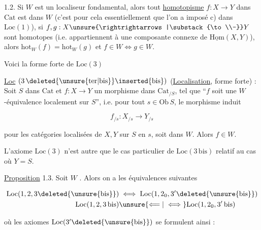 
 1.2.  Si $W$ est un
localiseur fondamental, alors tout \uline{homotopisme}
$f:X\to Y$ dans $\mathrm{Cat}$ est dans $W$ (c'est pour cela
essentiellement que l'on a imposé c) dans  $\mathrm{Loc}(1)$),
si $f,g:X\unsure{\rightrightarrows|\substack{\to\\-}}Y$ sont homotopes (i.e. appartiennent
à une \unsure{$=$} composante connexe de $\underline{\mathrm{Hom}}(X,Y)$),
alors $\mathrm{hot}_W(f)=\mathrm{hot}_W(g)$ et $f\in W\iff g\in W$.

 Voici la forme forte de $\mathrm{Loc}(3)$


\uline{Loc} $(3\,\deleted{\unsure{\mathrm{ter}|\mathrm{bis}}}\inserted{\mathrm{bis}})$ (\uline{Localisation}, forme forte) : Soit $S$ dans $\mathrm{Cat}$
et $f:X\to Y$ un morphisme dans $\mathrm{Cat}_{/S}$, tel que
``$f$ soit une $W$-équivalence localement sur $S$'', i.e.
pour tout $s\in\mathrm{Ob}\,S$, le morphisme induit

\[
f_{/s}:X_{/s}\longrightarrow Y_{/s}
\]

pour les catégories localisées de $X,Y$ sur $S$ en $s$,
soit dans $W$. Alors $f\in W$.

L'axiome $\mathrm{Loc}(3)$ n'est autre que le cas particulier de $\mathrm{Loc}(3\,\mathrm{bis})$ relatif au cas où $Y=S$.

\uline{Proposition} 1.3. Soit $W$ . Alors
on a les équivalences suivantes

\[
\begin{aligned}
\mathrm{Loc}(1,2,3\deleted{\unsure{\mathrm{bis}}})&\iff\mathrm{Loc}(1,2_0,3'\deleted{\unsure{\mathrm{bis}}})\\
\mathrm{Loc}(1,2,3\,\mathrm{bis})&\unsure{\Longleftarrow|\iff}\mathrm{Loc}(1,2_0,3'\,\mathrm{bis})
\end{aligned}
\]

où  les axiomes $\mathrm{Loc}(3'\deleted{\unsure{\mathrm{bis}}})$  se formulent ainsi :

